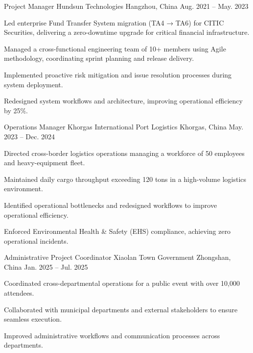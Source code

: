 
\begin{cventries}
\vspace{-4mm}
\cventry
  {Project Manager}
  {Hundsun Technologies}
  {Hangzhou, China}
  {Aug. 2021 – May. 2023}
  {
    \begin{cvitems}
        \item {Led enterprise Fund Transfer System migration (TA4 → TA6) for CITIC Securities, delivering a zero-downtime upgrade for critical financial infrastructure.}
        \item {Managed a cross-functional engineering team of 10+ members using Agile methodology, coordinating sprint planning and release delivery.}
        \item {Implemented proactive risk mitigation and issue resolution processes during system deployment.}
        \item {Redesigned system workflows and architecture, improving operational efficiency by 25\%.}
    \end{cvitems}
  }
\vspace{4mm}
\cventry
  {Operations Manager}
  {Khorgas International Port Logistics}
  {Khorgas, China}
  {May. 2023 – Dec. 2024}
  {
    \begin{cvitems}
        \item {Directed cross-border logistics operations managing a workforce of 50 employees and heavy-equipment fleet.}
        \item {Maintained daily cargo throughput exceeding 120 tons in a high-volume logistics environment.}
        \item {Identified operational bottlenecks and redesigned workflows to improve operational efficiency.}
        \item {Enforced Environmental Health \& Safety (EHS) compliance, achieving zero operational incidents.}
    \end{cvitems}
  }
\vspace{4mm}
\cventry
  {Administrative Project Coordinator}
  {Xiaolan Town Government}
  {Zhongshan, China}
  {Jan. 2025 – Jul. 2025}
  {
    \begin{cvitems}
        \item {Coordinated cross-departmental operations for a public event with over 10,000 attendees.}
        \item {Collaborated with municipal departments and external stakeholders to ensure seamless execution.}
        \item {Improved administrative workflows and communication processes across departments.}
    \end{cvitems}
  }
\end{cventries}